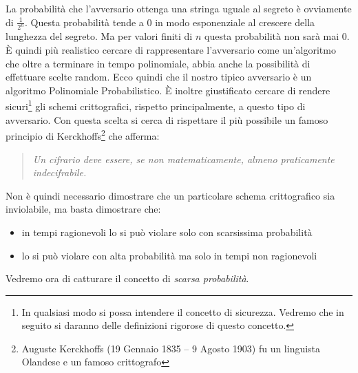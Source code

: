 \documentclass[a4paper,openright,twoside,12pt]{report}
\begin{document}
La probabilit\`a che l'avversario ottenga una stringa uguale al segreto \`e ovviamente di $\frac{1}{2^n}$. 
Questa probabilit\`a tende a 0 in modo esponenziale al crescere della lunghezza del segreto. Ma per valori finiti di $n$ questa probabilit\`a non sar\`a mai 0.
\`E quindi pi\`u realistico cercare di rappresentare l'avversario come un'algoritmo che oltre a terminare in tempo polinomiale, abbia
anche la possibilit\`a di effettuare scelte random.
Ecco quindi che il nostro tipico avversario \`e un algoritmo Polinomiale Probabilistico.
\`E inoltre giustificato cercare di rendere sicuri\footnote{In qualsiasi modo si possa intendere il concetto di sicurezza. 
Vedremo che in seguito si daranno delle definizioni rigorose di questo concetto.} gli schemi crittografici, rispetto principalmente, a questo tipo di avversario.
Con questa scelta si cerca di rispettare il pi\`u possibile un famoso principio di Kerckhoffs\footnote{Auguste Kerckhoffs (19 Gennaio 1835 – 9 Agosto 1903) 
fu un linguista Olandese e un famoso crittografo} che afferma: 
\begin{quotation}
\em
Un cifrario deve essere, se non matematicamente, almeno praticamente indecifrabile.
\end{quotation}
Non \`e quindi necessario dimostrare che un particolare schema crittografico sia inviolabile, ma basta dimostrare che:
\begin{itemize}
 \item in tempi ragionevoli lo si pu\`o violare solo con scarsissima probabilit\`a
 \item lo si pu\`o violare con alta probabilit\`a ma solo in tempi non ragionevoli
\end{itemize}
Vedremo ora di catturare il concetto di \emph{scarsa probabilit\`a}.
\end{document}
